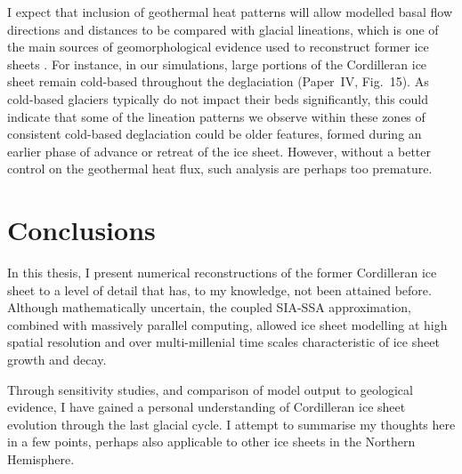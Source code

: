 \documentclass{article}
\newcommand{\CCYC}[0]{Paper~IV}     %
\begin{document}
I expect that inclusion of geothermal heat patterns will allow modelled basal
flow directions and distances to be compared with glacial lineations, which is
one of the main sources of geomorphological evidence used to reconstruct former
ice sheets \citep{Boulton.Clark.1990, Kleman.etal.1997, Kleman.etal.2010}. For
instance, in our simulations, large portions of the Cordilleran ice sheet
remain cold-based throughout the deglaciation (\CCYC, Fig.~15). As cold-based
glaciers typically do not impact their beds significantly, this could indicate
that some of the lineation patterns we observe within these zones of consistent
cold-based deglaciation could be older features, formed during an earlier phase
of advance or retreat of the ice sheet. However, without a better control on
the geothermal heat flux, such analysis are perhaps too premature.


\section{Conclusions}

In this thesis, I present numerical reconstructions of the former Cordilleran
ice sheet to a level of detail that has, to my knowledge, not been attained
before. Although mathematically uncertain, the coupled SIA-SSA approximation,
combined with massively parallel computing, allowed ice sheet modelling at
high spatial resolution and over multi-millenial time scales characteristic
of ice sheet growth and decay.

Through sensitivity studies, and comparison of model output to geological
evidence, I have gained a personal understanding of Cordilleran ice sheet
evolution through the last glacial cycle. I attempt to summarise my thoughts
here in a few points, perhaps also applicable to other ice sheets in the
Northern Hemisphere.
\end{document}
